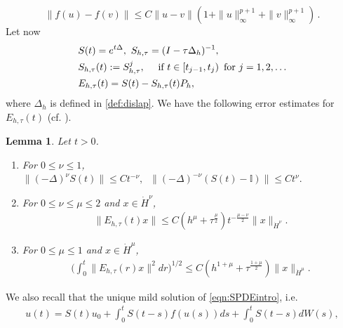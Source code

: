 \documentclass[reqno, 11pt]{amsart}
\newcommand{\gsnote}[1]{\textcolor{Cerulean}{#1}}
\theoremstyle{plain}
\newtheorem{lemma}[theorem]{Lemma}
\theoremstyle{definition}
\theoremstyle{remark}
\numberwithin{equation}{section}
\numberwithin{theorem}{section}
\begin{document}
{\begin{equation}\label{eqn: f polynomial}
\|f(u)-f(v)\|\leq C \|u-v\|(1+\|u\|_\infty^{p+1}+\|v\|_\infty^{p+1}) \,.
\end{equation}
Let now  
\begin{align}
&S(t)=e^{t\Delta}, \,\, S_{h,\tau}=(I-\tau \Delta_h)^{-1}, \notag\\
&S_{h,\tau}(t):=S_{h,\tau}^j, \quad \text { if } t \in\left[t_{j-1}, t_j\right) \text { for } j=1,2, \ldots \notag\\
&E_{h,\tau}(t)=S(t)-S_{h,\tau}(t)P_h,
\end{align}
where $\Delta_h$ is defined in \eqref{def:dislap}.
We have the following error estimates for $E_{h,\tau}(t)$ (cf. \cite[Lemma 3.12 and 3.13]{Kruse}).
\begin{lemma}\label{lem:serrop}
Let $t>0$. 
\begin{enumerate}
\item For $0\leq \nu\leq 1$,  $\|(-\Delta)^\nu S(t)\|\leq Ct^{-\nu},\;\;\|(-\Delta)^{-\nu}(S(t)-\mathbb{I})\|\leq Ct^\nu.$
\item For $0\leq \nu\leq \mu\leq 2$ and $x\in \dot{H}^\nu$, 
\begin{align}
\|E_{h,\tau}(t)x\|\leq C(h^\mu+\tau^{\frac{\mu}{2}})t^{-\frac{\mu-\nu}{2}}\|x\|_{\dot{H}^{\nu}}. 
\end{align}
\item For $0\leq \mu\leq 1$ and $x\in \dot{H}^\mu$,
\begin{align}
\bigg(\int_0^t\|E_{h,\tau}(r)x\|^2dr\bigg)^{1/2}\leq C(h^{1+\mu}+\tau^{\frac{1+\mu}{2}})\|x\|_{\dot{H}^\mu}.
\end{align}
\end{enumerate}
\end{lemma}
We also recall that the unique mild solution of  
\eqref{eqn:SPDEintro}, i.e. 
\begin{align}\label{eq:truesol}
u(t)=S(t)u_0+\int_0^t S(t-s)f(u(s))ds+\int_0^t S(t-s)dW(s), 

\end{align}}
\end{document}
